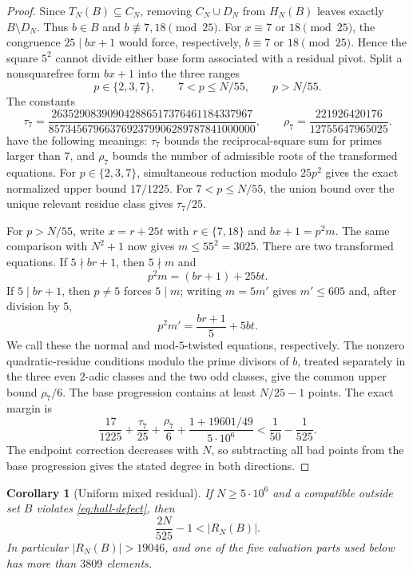 \documentclass[11pt]{article}
\newtheorem{corollary}[theorem]{Corollary}
\theoremstyle{definition}
\newcommand{\CN}{C_N}
\newcommand{\DN}{D_N}
\newcommand{\TN}{T_N}
\newcommand{\RN}{R_N}
\newcommand{\FiveMillion}{5\cdot10^6}
\begin{document}
\begin{proof}
Since $\TN(B)\subseteq\CN$, removing $\CN\cup\DN$ from $H_N(B)$ leaves
exactly $B\setminus\DN$.  Thus $b\in B$ and
$b\not\equiv7,18\pmod {25}$.  For $x\equiv7$ or $18\pmod {25}$, the
congruence $25\mid bx+1$ would force, respectively,
$b\equiv7$ or $18\pmod {25}$.  Hence the square $5^2$ cannot divide either
base form associated with a residual pivot.
Split a nonsquarefree form $bx+1$ into the three ranges
\[
 p\in\{2,3,7\},\qquad 7<p\leq N/55,\qquad p>N/55.
\]
The constants
\[
 \tau_7=
 \frac{263529083909042886517376461184337967}
 {8573456796637692379906289787841000000},
 \qquad
 \rho_7=\frac{221926420176}{12755647965025}.
\]
 have the following meanings: $\tau_7$ bounds the reciprocal-square sum for
 primes larger than $7$, and $\rho_7$ bounds the number of admissible roots of
 the transformed equations.
For $p\in\{2,3,7\}$, simultaneous reduction modulo $25p^2$ gives the exact
normalized upper bound $17/1225$.  For $7<p\leq N/55$, the union bound over
the unique relevant residue class gives $\tau_7/25$.

For $p>N/55$, write $x=r+25t$ with $r\in\{7,18\}$ and
$bx+1=p^2m$.  The same comparison with $N^2+1$ now gives $m\leq55^2=3025$.
 There are two transformed equations.  If
$5\nmid br+1$, then $5\nmid m$ and
\[
 p^2m=(br+1)+25bt.
\]
If $5\mid br+1$, then $p\neq5$ forces $5\mid m$; writing $m=5m'$ gives
$m'\leq605$ and, after division by $5$,
\[
 p^2m'=\frac{br+1}{5}+5bt.
\]
 We call these the normal and mod-$5$-twisted equations, respectively.
The nonzero quadratic-residue conditions modulo the prime divisors of $b$,
treated separately in the three even $2$-adic classes and the two odd classes,
give the common upper bound $\rho_7/6$.
The base progression contains at least $N/25-1$ points.  The exact margin is
\[
 \frac{17}{1225}
 +\frac{\tau_7}{25}
 +\frac{\rho_7}6
 +\frac{1+19601/49}{\FiveMillion}
 <\frac1{50}-\frac1{525}.
\]
The endpoint correction decreases with $N$, so subtracting all bad points
from the base progression gives the stated degree in both directions.
\end{proof}

\begin{corollary}[Uniform mixed residual]\label{cor:uniform-mixed-residual}
If $N\geq\FiveMillion$ and a compatible outside set $B$ violates
\eqref{eq:hall-defect}, then
\begin{equation}\label{eq:mixed-residual}
  \frac{2N}{525}-1<|\RN(B)|.
\end{equation}
In particular $|\RN(B)|>19046$, and one of the five valuation parts used
below has more than $3809$ elements.
\end{corollary}
\end{document}

